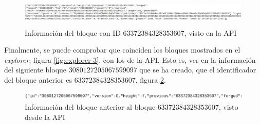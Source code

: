 \begin{figure}[H]
	\centering
	\includegraphics[width=14.7cm,height=1.4cm]{figuras/explorer_5.png}
	\caption{Información del bloque con ID $63372384328353607$, visto en la API}
	\label{fig:explorer-5}
\end{figure}

Finalmente, se puede comprobar que coinciden los bloques mostrados en el \textit{explorer}, figura \ref{fig:explorer-3}, con los de la API. Esto es, ver en la información del siguiente bloque $3080127205067599097$ que se ha creado, que el identificador del bloque anterior es $63372384328353607$, figura \ref{fig:explorer-6}.\\

\begin{figure}[H]
	\centering
	\includegraphics[width=13cm,height=0.4cm]{figuras/explorer_6.png}
	\caption{Información del bloque anterior al bloque $63372384328353607$, visto desde la API}
	\label{fig:explorer-6}
\end{figure}


\newpage







